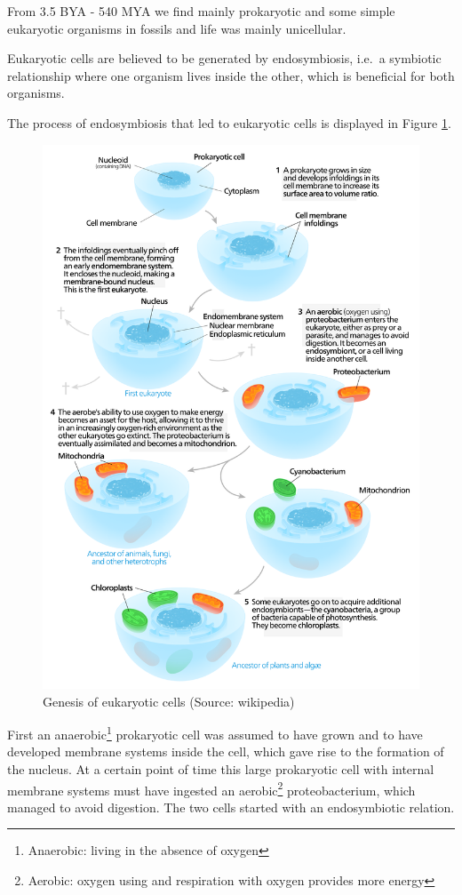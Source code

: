 \documentclass[
  11pt,
]{book}
\begin{document}
From 3.5 BYA - 540 MYA we find mainly prokaryotic and some simple eukaryotic organisms in fossils and life was mainly unicellular.

Eukaryotic cells are believed to be generated by endosymbiosis, i.e.~a symbiotic relationship where one organism lives inside the other, which is beneficial for both organisms.

The process of endosymbiosis that led to eukaryotic cells is displayed in Figure \ref{fig:endosymbiosis}.

\begin{figure}

{\centering \includegraphics[width=0.8\linewidth]{./figs/endosymbiosis} 

}

\caption{Genesis of eukaryotic cells (Source: wikipedia)}\label{fig:endosymbiosis}
\end{figure}

First an anaerobic\footnote{Anaerobic: living in the absence of oxygen} prokaryotic cell was assumed to have grown and to have developed membrane systems inside the cell, which gave rise to the formation of the nucleus. At a certain point of time this large prokaryotic cell with internal membrane systems must have ingested an aerobic\footnote{Aerobic: oxygen using and respiration with oxygen provides more energy} proteobacterium, which managed to avoid digestion. The two cells started with an endosymbiotic relation.
\end{document}
